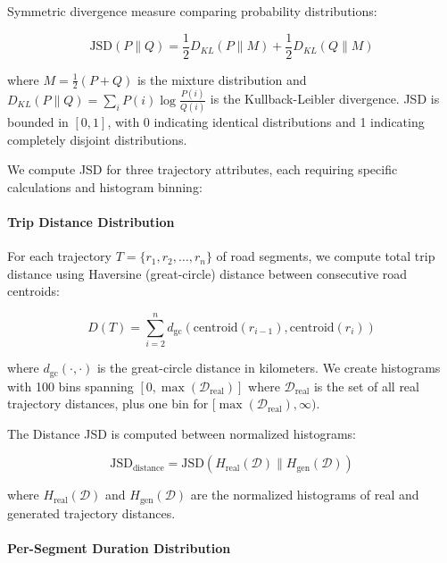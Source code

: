 Symmetric divergence measure comparing probability distributions:

\begin{equation}
\text{JSD}(P \parallel Q) = \frac{1}{2} D_{KL}(P \parallel M) + \frac{1}{2} D_{KL}(Q \parallel M)
\label{eq:jsd-appendix}
\end{equation}

where $M = \frac{1}{2}(P + Q)$ is the mixture distribution and $D_{KL}(P \parallel Q) = \sum_i P(i) \log \frac{P(i)}{Q(i)}$ is the Kullback-Leibler divergence. JSD is bounded in $[0, 1]$, with 0 indicating identical distributions and 1 indicating completely disjoint distributions.

We compute JSD for three trajectory attributes, each requiring specific calculations and histogram binning:

\paragraph{Trip Distance Distribution}

For each trajectory $T = \{r_1, r_2, \ldots, r_n\}$ of road segments, we compute total trip distance using Haversine (great-circle) distance between consecutive road centroids:

\begin{equation}
D(T) = \sum_{i=2}^{n} d_{\text{gc}}(\text{centroid}(r_{i-1}), \text{centroid}(r_i))
\label{eq:trip-distance}
\end{equation}

where $d_{\text{gc}}(\cdot, \cdot)$ is the great-circle distance in kilometers. We create histograms with 100 bins spanning $[0, \max(\mathcal{D}_{\text{real}})]$ where $\mathcal{D}_{\text{real}}$ is the set of all real trajectory distances, plus one bin for $[\max(\mathcal{D}_{\text{real}}), \infty)$.

The Distance JSD is computed between normalized histograms:

\begin{equation}
\text{JSD}_{\text{distance}} = \text{JSD}(H_{\text{real}}(\mathcal{D}) \parallel H_{\text{gen}}(\mathcal{D}))
\label{eq:distance-jsd}
\end{equation}

where $H_{\text{real}}(\mathcal{D})$ and $H_{\text{gen}}(\mathcal{D})$ are the normalized histograms of real and generated trajectory distances.

\paragraph{Per-Segment Duration Distribution}

